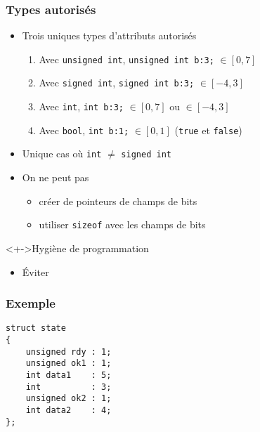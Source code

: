 \begin{frame}
\frametitle{Types autorisés}
\begin{itemize}[<+->]
\item Trois uniques types d'attributs autorisés
	\begin{enumerate}
	\item Avec \lstinline|unsigned int|, \lstinline|unsigned int b:3;| $\in [0,7]$
	\item Avec \lstinline|signed int|, \lstinline|signed int b:3;| $\in [-4,3]$
	\item Avec \lstinline|int|, \lstinline|int b:3;| $\in [0,7]$ ou $\in [-4,3]$ 
	\item Avec \lstinline|bool|, \lstinline|int b:1;| $\in [0,1]$ (\lstinline|true| et \lstinline|false|)
	\end{enumerate}
\item Unique cas où \lstinline|int| $\neq$ \lstinline|signed int|
\item On ne peut pas 
	\begin{itemize}
	\item créer de pointeurs de champs de bits
	\item utiliser \lstinline|sizeof| avec les champs de bits
	\end{itemize}
\end{itemize}
\begin{block}<+->{Hygiène de programmation}
	\begin{itemize}[<+->]
	\item Éviter
	\end{itemize}
\end{block}
\end{frame}

\begin{frame}[containsverbatim]
\frametitle{Exemple}
\begin{lstlisting}
struct state
{
	unsigned rdy : 1;
	unsigned ok1 : 1;
	int data1    : 5;
	int          : 3;
	unsigned ok2 : 1;
	int data2    : 4;
};
\end{lstlisting}
\begin{center}
\end{center}
\end{frame}

